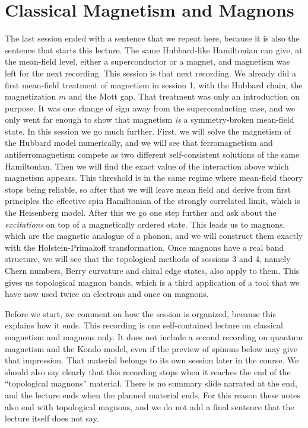 \chapter{Classical Magnetism and Magnons}

The last session ended with a sentence that we repeat here, because it is also the sentence that
starts this lecture. The same Hubbard-like Hamiltonian can give, at the mean-field level, either a
superconductor or a magnet, and magnetism was left for the next recording. This session is that next
recording. We already did a first mean-field treatment of magnetism in session 1, with the Hubbard
chain, the magnetization $m$ and the Mott gap. That treatment was only an introduction on purpose. It
was one change of sign away from the superconducting case, and we only went far enough to show that
magnetism \emph{is} a symmetry-broken mean-field state. In this session we go much further. First, we
will solve the magnetism of the Hubbard model numerically, and we will see that ferromagnetism and
antiferromagnetism compete as two different self-consistent solutions of the same Hamiltonian. Then we
will find the exact value of the interaction above which magnetism appears. This threshold is in the
same regime where mean-field theory stops being reliable, so after that we will leave mean field and
derive from first principles the effective spin Hamiltonian of the strongly correlated limit, which is
the Heisenberg model. After this we go one step further and ask about the \emph{excitations} on top
of a magnetically ordered state. This leads us to magnons, which are the magnetic analogue of a
phonon, and we will construct them exactly with the Holstein-Primakoff transformation. Once magnons
have a real band structure, we will see that the topological methods of sessions 3 and 4, namely
Chern numbers, Berry curvature and chiral edge states, also apply to them. This gives us topological
magnon bands, which is a third application of a tool that we have now used twice on electrons and
once on magnons.

Before we start, we comment on how the session is organized, because this explains how it ends.
This recording is one self-contained lecture on classical magnetism and magnons only. It does not
include a second recording on quantum magnetism and the Kondo model, even if the preview of spinons
below may give that impression. That material belongs to its own session later in the course. We
should also say clearly that this recording stops when it reaches the end of the ``topological
magnons'' material. There is no summary slide narrated at the end, and the lecture ends when the
planned material ends. For this reason these notes also end with topological magnons, and we do not
add a final sentence that the lecture itself does not say.

